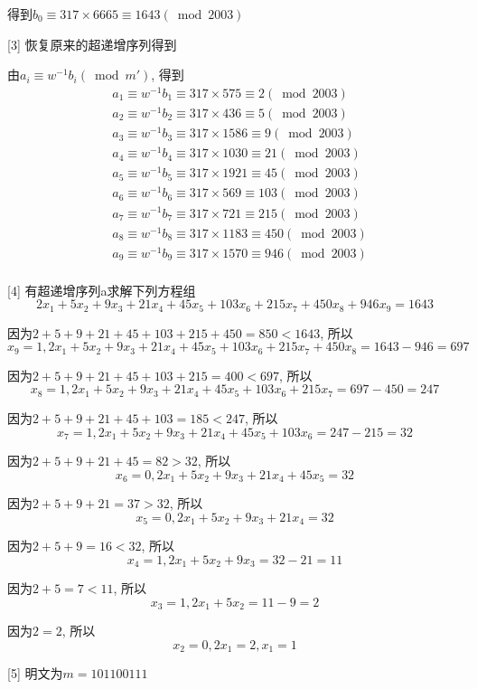 \documentclass[UTF8]{ctexart}
\begin{document}
\begin{enumerate}
        得到$b_0\equiv 317\times 6665\equiv 1643(\bmod 2003)$

        [3] 恢复原来的超递增序列得到

        由$a_i\equiv w^{-1}b_i(\bmod m')$, 得到
        $$
        \begin{aligned}
            &a_1\equiv w^{-1}b_1\equiv 317\times 575\equiv 2(\bmod 2003)\\
            &a_2\equiv w^{-1}b_2\equiv 317\times 436\equiv 5(\bmod 2003)\\
            &a_3\equiv w^{-1}b_3\equiv 317\times 1586\equiv 9(\bmod 2003)\\
            &a_4\equiv w^{-1}b_4\equiv 317\times 1030\equiv 21(\bmod 2003)\\
            &a_5\equiv w^{-1}b_5\equiv 317\times 1921\equiv 45(\bmod 2003)\\
            &a_6\equiv w^{-1}b_6\equiv 317\times 569\equiv 103(\bmod 2003)\\
            &a_7\equiv w^{-1}b_7\equiv 317\times 721\equiv 215(\bmod 2003)\\
            &a_8\equiv w^{-1}b_8\equiv 317\times 1183\equiv 450(\bmod 2003)\\
            &a_9\equiv w^{-1}b_9\equiv 317\times 1570\equiv 946(\bmod 2003)\\
        \end{aligned}
        $$

        [4] 有超递增序列a求解下列方程组
        $$2x_1+5x_2+9x_3+21x_4+45x_5+103x_6+215x_7+450x_8+946x_9=1643$$

        因为$2+5+9+21+45+103+215+450=850<1643$, 所以
        $$x_9=1, 2x_1+5x_2+9x_3+21x_4+45x_5+103x_6+215x_7+450x_8=1643-946=697$$

        因为$2+5+9+21+45+103+215=400<697$, 所以
        $$x_8=1, 2x_1+5x_2+9x_3+21x_4+45x_5+103x_6+215x_7=697-450=247$$

        因为$2+5+9+21+45+103=185<247$, 所以
        $$x_7=1, 2x_1+5x_2+9x_3+21x_4+45x_5+103x_6=247-215=32$$

        因为$2+5+9+21+45=82>32$, 所以
        $$x_6=0, 2x_1+5x_2+9x_3+21x_4+45x_5=32$$

        因为$2+5+9+21=37>32$, 所以
        $$x_5=0, 2x_1+5x_2+9x_3+21x_4=32$$

        因为$2+5+9=16<32$, 所以
        $$x_4=1, 2x_1+5x_2+9x_3=32-21=11$$

        因为$2+5=7<11$, 所以
        $$x_3=1, 2x_1+5x_2=11-9=2$$

        因为$2=2$, 所以
        $$x_2=0, 2x_1=2, x_1=1$$

        [5] 明文为$m=101100111$
    \end{enumerate}
\end{document}
